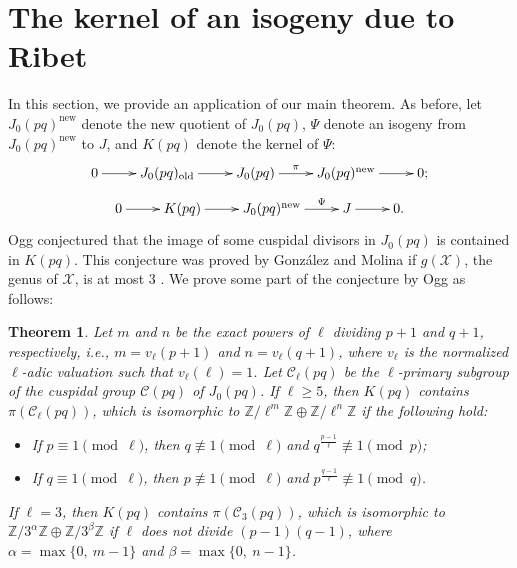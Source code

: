 \documentclass[a4paper, 12pt]{amsart}
\newtheorem{thm}{Theorem}[section]
\theoremstyle{definition}
\theoremstyle{remark}
\numberwithin{equation}{section} \numberwithin{table}{section}
\begin{document}
\section{The kernel of an isogeny due to Ribet}\label{sec:kernelofisogeny}
In this section, we provide an application of our main theorem. As before, let $J_0(pq)^{{\mathrm{new}}}$ denote the new quotient of $J_0(pq)$,
$\Psi$ denote an isogeny from $J_0(pq)^{{\mathrm{new}}}$ to $J$, and $K(pq)$ denote the kernel of $\Psi$:
$$
\xymatrix{
0 \ar[r] & J_0(pq)_{{\mathrm{old}}} \ar[r] & J_0(pq) \ar[r]^-{\pi} & J_0(pq)^{{\mathrm{new}}} \ar[r] & 0;
}
$$
$$
\xymatrix{
0\ar[r] & K(pq) \ar[r] & J_0(pq)^{{\mathrm{new}}} \ar[r]^-{\Psi} & J \ar[r] & 0.
}
$$
Ogg \cite{Og85} conjectured that the image of some cuspidal divisors in $J_0(pq)$ is contained in $K(pq)$. This conjecture was proved by Gonz\'alez and Molina \cite{GM11} if $g({{\mathcal{X}}})$, the genus of ${{\mathcal{X}}}$, is at most $3$ . We prove some part of the conjecture by Ogg as follows:

\begin{thm} 
Let $m$ and $n$ be the exact powers of $\ell$ dividing $p+1$ and $q+1$, respectively, i.e., $m=v_{\ell}(p+1)$ and $n=v_{\ell}(q+1)$, where $v_{\ell}$ is the normalized $\ell$-adic valuation such that $v_{\ell}(\ell)=1$.
Let ${{\mathcal{C}}}_{\ell}(pq)$ be the $\ell$-primary subgroup of the cuspidal group ${{\mathcal{C}}}(pq)$ of $J_0(pq)$.
If $\ell\geq 5$, then $K(pq)$ contains $\pi({{\mathcal{C}}}_{\ell}(pq))$, which is isomorphic to ${{{{\mathbb{Z}}}/{{\ell^m}}{{\mathbb{Z}}}}} \oplus {{{{\mathbb{Z}}}/{{\ell^n}}{{\mathbb{Z}}}}}$  
if the following hold:
\begin{itemize}
\item If $p\equiv 1 {{ \!\pmod {\ell}}}$, then $q\not\equiv 1 {{ \!\pmod {\ell}}}$ and $q^{\frac{p-1}{\ell}} \not\equiv 1 \pmod p$;
\item If $q\equiv 1 {{ \!\pmod {\ell}}}$, then $p\not\equiv 1 {{ \!\pmod {\ell}}}$ and $p^{\frac{q-1}{\ell}} \not\equiv 1 \pmod q$.
\end{itemize}
If $\ell=3$, then $K(pq)$ contains $\pi({{\mathcal{C}}}_3(pq))$, which is isomorphic to ${{{{\mathbb{Z}}}/{{3^{\alpha}}}{{\mathbb{Z}}}}} \oplus {{{{\mathbb{Z}}}/{{3^{\beta}}}{{\mathbb{Z}}}}}$ if $\ell$ does not divide $(p-1)(q-1)$, where $\alpha=\max \{0,~m-1\}$ and $\beta=\max \{0, ~n-1\}$.
\end{thm}
\end{document}
